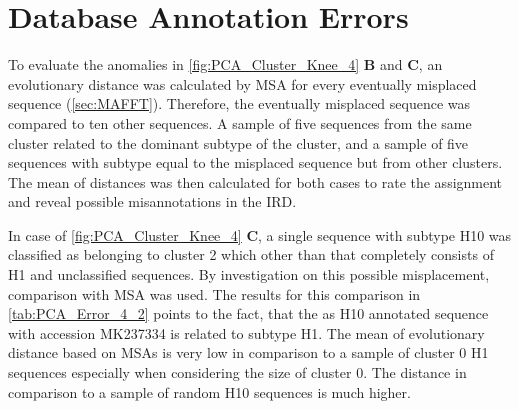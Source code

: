 \section{Database Annotation Errors} \label{sec:Clustering_Anomalies}

To evaluate the anomalies in \autoref{fig:PCA_Cluster_Knee_4} \textbf{\textsf{B}} and \textbf{\textsf{C}}, an evolutionary distance was calculated by \gls{MSA} for every eventually misplaced sequence (\autoref{sec:MAFFT}). Therefore, the eventually misplaced sequence was compared to ten other sequences. A sample of five sequences from the same cluster related to the dominant subtype of the cluster, and a sample of five sequences with subtype equal to the misplaced sequence but from other clusters. The mean of distances was then calculated for both cases to rate the assignment and reveal possible misannotations in the \gls{IRD}. 

\begin{table}[!hbt]
    \centering
    \caption[Anomalies in segment 4 cluster 2 with PK]{\textbf{Anomalies in segment 4 cluster 2 with PK.} The \glspl{MSA} mean distance of the given sequences in comparison to a sample of H1 sequences of the same cluster and a sample of H10 sequences present in other clusters.}
    \label{tab:PCA_Error_4_2}
\end{table}

In case of \autoref{fig:PCA_Cluster_Knee_4} \textbf{\textsf{C}}, a single sequence with subtype H10 was classified as belonging to cluster 2 which other than that completely consists of H1 and unclassified sequences. By investigation on this possible misplacement, comparison with \gls{MSA} was used. The results for this comparison in \autoref{tab:PCA_Error_4_2} points to the fact, that the as H10 annotated sequence with accession MK237334 is related to subtype H1. The mean of evolutionary distance based on \glspl{MSA} is very low in comparison to a sample of cluster 0 H1 sequences especially when considering the size of cluster 0. The distance in comparison to a sample of random H10 sequences is much higher. 

